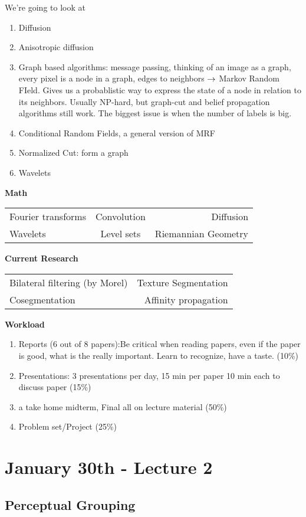 We're going to look at
\begin{enumerate}
\item Diffusion
\item Anisotropic diffusion
\item Graph based algorithms: message passing, thinking of an image as
  a graph, every pixel is a node in a graph, edges to neighbors
  $\rightarrow$ Markov Random FIeld. Gives us a probablistic way to express
  the state of a node in relation to its neighbors. Usually NP-hard, but graph-cut and
  belief propagation algorithms still work. The biggest issue is when
  the number of labels is big.
\item Conditional Random Fields, a general version of MRF
\item Normalized Cut: form a graph
\item Wavelets
\end{enumerate}

\textbf{Math}
\begin{tabular}{l c r}
Fourier transforms &  Convolution & Diffusion\\
Wavelets & Level sets & Riemannian Geometry  \\
\end{tabular}

\textbf{Current Research}
\begin{tabular}{l r}
Bilateral filtering (by Morel) & Texture Segmentation\\
Cosegmentation & Affinity propagation\\
\end{tabular}

\textbf{Workload}
\begin{enumerate}
\item Reports (6 out of 8 papers):Be critical when reading papers, even if the paper is good, what is
the really important. Learn to recognize, have a taste. (10\%)
\item Presentations: 3 presentations per day, 15 min per paper 10 min
  each to discuss paper (15\%)
\item a take home midterm, Final all on lecture material (50\%)
\item Problem set/Project (25\%)
\end{enumerate}
\pagebreak
\section{January 30th - Lecture 2}

\subsection{Perceptual Grouping}


